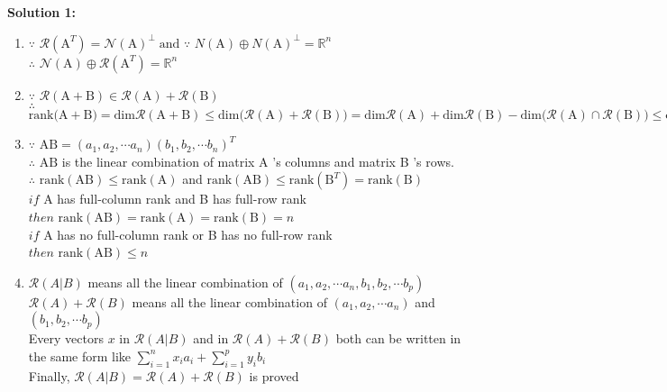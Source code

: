 \documentclass[english,onecolumn,UTF8]{IEEEtran}
\begin{document}
	\textbf{Solution 1:}
	\begin{enumerate}
	\item 
		$\because$ $\mathcal{R}(\mathrm{A}^T)=\mathcal{N}(\mathrm{A})^\perp \; \mbox{and} $ 
		$\because$ $N(\mathrm{A})\oplus N(\mathrm{A})^\perp =\mathbb{R}^n$\\
		$\therefore$ $\mathcal{N}(\mathrm{A})\oplus \mathcal{R}(\mathrm{A}^T)=\mathbb{R}^n$

	\item 
		$\because$ $\mathcal{R}(\mathrm{A}+\mathrm{B})\in \mathcal{R}(\mathrm{A})+\mathcal{R}(\mathrm{B})$\\
		$\therefore$ $\mbox{rank}(\mathrm{A}+\mathrm{B)}=\mbox{dim}\mathcal{R}(\mathrm{A}+\mathrm{B})\leq \mbox{dim}\Big(\mathcal{R}(\mathrm{A})+\mathcal{R}(\mathrm{B})\Big)=\mbox{dim}\mathcal{R}(\mathrm{A})+\mbox{dim}\mathcal{R}(\mathrm{B})-\mbox{dim}\Big(\mathcal{R}(\mathrm{A})\cap \mathcal{R}(\mathrm{B})\Big)\leq \mbox{dim}\mathcal{R}(\mathrm{A})+\mbox{dim}\mathcal{R}(\mathrm{B})=\mbox{rank}(\mathrm{A})+\mbox{rank}(\mathrm{B})$

	\item 
		$\because$ $\mathrm{A}\mathrm{B}=(a_1,a_2,\cdots a_n)(b_1,b_2,\cdots b_n)^T$\\
		$\therefore$ $\mathrm{A}\mathrm{B}$ is the linear combination of  matrix A 's columns and matrix B 's rows.\\
		$\therefore$ $\mbox{rank}(\mathrm{A}\mathrm{B})\leq \mbox{rank}(\mathrm{A})$ and $\mbox{rank}(\mathrm{A}\mathrm{B})\leq \mbox{rank}(\mathrm{B}^T)=\mbox{rank}(\mathrm{B})$\\
		$if$ A has full-column rank and B has full-row rank\\
		$then$ $\mbox{rank}(\mathrm{A}\mathrm{B})=\mbox{rank}(\mathrm{A})=\mbox{rank}(\mathrm{B})=n$\\
		$if$ A has no full-column rank or B has no full-row rank\\
		$then$ $\mbox{rank}(\mathrm{A}\mathrm{B})\leq n$

	\item 
		$\mathcal{R}(A|B)$ means all the linear combination of  $(a_1,a_2,\cdots a_n,b_1,b_2,\cdots b_p)$\\
		$\mathcal{R}(A)+\mathcal{R}(B)$ means all the linear combination of  $(a_1,a_2,\cdots a_n)$ and $(b_1,b_2,\cdots b_p)$\\
		Every vectors $x$ in $\mathcal{R}(A|B)$ and in $\mathcal{R}(A)+\mathcal{R}(B)$ both can be written in the same form like $\sum^n_{i=1}x_ia_i+\sum^p_{i=1}y_ib_i$\\
		Finally,  $\mathcal{R}(A|B)=\mathcal{R}(A)+\mathcal{R}(B)$ is proved


\end{enumerate}
\end{document}
